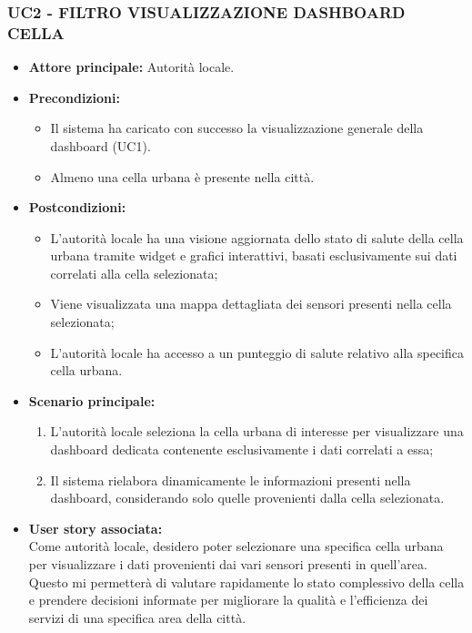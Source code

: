 \subsubsection{UC2 - FILTRO VISUALIZZAZIONE DASHBOARD CELLA}
\begin{itemize}
    \item \textbf{Attore principale:} Autorità locale.
    \item \textbf{Precondizioni:}
        \begin{itemize}
            \item Il sistema ha caricato con successo la visualizzazione generale della dashboard (UC1). 
            \item Almeno una cella urbana è presente nella città. 
        \end{itemize}
    \item \textbf{Postcondizioni:}
        \begin{itemize}
            \item L’autorità locale ha una visione aggiornata dello stato di salute della cella urbana tramite widget e grafici interattivi, basati esclusivamente sui dati correlati alla cella selezionata;
            \item Viene visualizzata una mappa dettagliata dei sensori presenti nella cella selezionata;
            \item L'autorità locale ha accesso a un punteggio di salute relativo alla specifica cella urbana. 
        \end{itemize}
    \item \textbf{Scenario principale:}
        \begin{enumerate}
            \item L’autorità locale seleziona la cella urbana di interesse per visualizzare una dashboard dedicata contenente esclusivamente i dati correlati a essa;
            \item Il sistema rielabora dinamicamente le informazioni presenti nella dashboard, considerando solo quelle provenienti dalla cella selezionata.
        \end{enumerate}
    \item \textbf{User story associata:} \\ 
        Come autorità locale, desidero poter selezionare una specifica cella urbana per visualizzare i dati provenienti dai vari sensori presenti in quell’area. Questo mi permetterà di valutare rapidamente lo stato complessivo della cella e prendere decisioni informate per migliorare la qualità e l'efficienza dei servizi di una specifica area della città.
\end{itemize}

